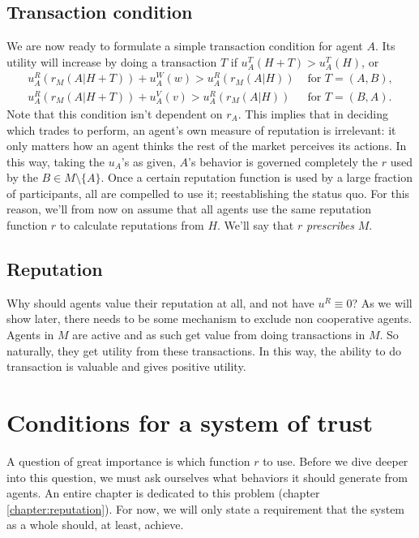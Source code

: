 \subsection{Transaction condition}
We are now ready to formulate a simple transaction condition for agent $A$. 
Its utility will increase by doing a transaction $T$ if $u^T_A(H + T) > u^T_A(H)$, 
or 
\begin{align*}
u^R_A(r_M(A|H + T)) + u^W_A(w) > u^R_A(r_M(A|H)) &\text{ for } T = (A, B),\\
u^R_A(r_M(A|H + T)) + u^V_A(v) > u^R_A(r_M(A|H)) &\text{ for } T = (B, A).
\end{align*}
Note that this condition isn't dependent on $r_A$. 
This implies that in deciding which trades to perform, 
an agent's own measure of reputation is irrelevant: 
it only matters how an agent thinks the rest of the market perceives its actions. 
In this way, taking the $u_A$'s as given, 
$A$'s behavior is governed completely the $r$ used by the $B \in M \setminus \{ A \}$. 
Once a certain reputation function is used by a large fraction of participants, 
all are compelled to use it; 
reestablishing the status quo. 
For this reason, we'll from now on assume that all agents use the same reputation function $r$ to calculate reputations from $H$. We'll say that $r$ \emph{prescribes} $M$.

\subsection{Reputation}
Why should agents value their reputation at all, 
and not have $u^R \equiv 0$? 
As we will show later, 
there needs to be some mechanism to exclude non cooperative agents. 
Agents in $M$ are active and as such get value from doing transactions in $M$. 
So naturally, they get utility from these transactions. 
In this way, the ability to do transaction is valuable and gives positive utility.

\section{Conditions for a system of trust}
A question of great importance is which function $r$ to use. 
Before we dive deeper into this question, 
we must ask ourselves what behaviors it should generate from agents. 
An entire chapter is dedicated to this problem (chapter \ref{chapter:reputation}). 
For now, we will only state a requirement that the system as a whole should, at least, achieve.


